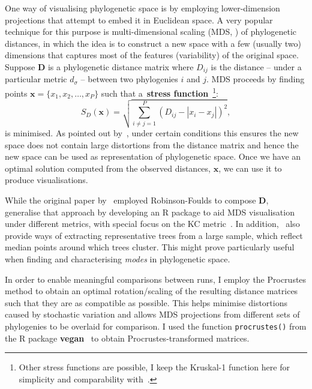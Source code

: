One way of visualising phylogenetic space is by employing lower-dimension projections that attempt to embed it in Euclidean space.
A very popular technique for this purpose is multi-dimensional scaling (MDS, \cite{Hillis2005}) of phylogenetic distances, in which the idea is to construct a new space with a few (usually two) dimensions that captures most of the features (variability) of the original space.
Suppose $\boldsymbol D$ is a phylogenetic distance matrix where $D_{ij}$ is the distance -- under a particular metric $d_\sigma$ -- between two  phylogenies $i$ and $j$.
MDS proceeds by finding points $\boldsymbol x = \{x_1, x_2, \ldots, x_P\}$ such that a~\textbf{stress function}~\citep{Kruskal1964}\footnote{Other stress functions are possible, I keep the Kruskal-1 function here for simplicity and comparability with~\cite{Hillis2005}.}:
\begin{equation}
 \label{eq:stressF}
 S_D(\boldsymbol x) =  \sqrt{ \sum_{i \neq j = 1}^P \left( D_{ij} - |x_i - x_j|\right)^2},
\end{equation}
is minimised.
As pointed out by~\cite{Hillis2005}, under certain conditions this ensures the new space does not contain large distortions from the distance matrix and hence the new space can be used as representation of phylogenetic space.
Once we have an optimal solution computed from the observed distances, $\boldsymbol x$, we can use it to produce visualisations.

While the original paper by~\cite{Hillis2005} employed Robinson-Foulds to compose $\boldsymbol D$,~\cite{Jombart2017} generalise that approach by developing an R package to aid MDS visualisation under different metrics, with special focus on the KC metric~\citep{Kendall2016}.
In addition,~\cite{Jombart2017} also provide ways of extracting representative trees from a large sample, which reflect median points around which trees cluster.
This might prove particularly useful when finding and characterising \textit{modes} in phylogenetic space.

In order to enable meaningful comparisons between runs, I employ the Procrustes method to obtain an optimal rotation/scaling of the resulting distance matrices such that they are as compatible as possible. 
This helps minimise distortions caused by stochastic variation and allows MDS projections from different sets of phylogenies to be overlaid for comparison.
I used the function \verb|procrustes()| from the R package \textbf{vegan}~\citep{Oksanen2018} to obtain Procrustes-transformed matrices.

